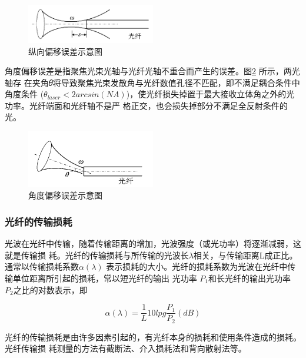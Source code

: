 \documentclass[10pt,a4paper,twoside,UTF8]{ctexart}
\begin{document}
\begin{figure}[H]
	\centering
	\includegraphics[width=0.5\textwidth]{img//5.png}
	\caption{纵向偏移误差示意图}
	\label{fig:5}
\end{figure}

角度偏移误差是指聚焦光束光轴与光纤光轴不重合而产生的误差。图\ref{fig:6} 所示，两光轴存
在夹角𝜃将导致聚焦光束发散角与光纤数值孔径不匹配，即不满足耦合条件中角度条件
($\theta_{laser}<2 arcsin(NA)$)，使光纤损失掉置于最大接收立体角之外的光功率。光纤端面和光纤轴不是严
格正交，也会损失掉部分不满足全反射条件的光。

\begin{figure}[H]
	\centering
	\includegraphics[width=0.5\textwidth]{img//6.png}
	\caption{ 角度偏移误差示意图}
	\label{fig:6}
\end{figure}

\subsubsection{光纤的传输损耗}
光波在光纤中传输，随着传输距离的增加，光波强度（或光功率）将逐渐减弱，这就是传输损
耗。光纤的传输损耗与所传输的光波长$\lambda$相关，与传输距离L成正比。通常以传输损耗系数$\alpha(\lambda)$
表示损耗的大小。光纤的损耗系数为光波在光纤中传输单位距离所引起的损耗，常以短光纤的输出
光功率 $P_1$和长光纤的输出光功率 $P_2$之比的对数表示，即

\begin{equation}
	\alpha\left(\lambda\right)=\frac{1}{L} 10 lpg \frac{P_1}{P_2} (dB)
	\label{eq:eff}
\end{equation}

光纤的传输损耗是由许多因素引起的，有光纤本身的损耗和使用条件造成的损耗。光纤传输损
耗测量的方法有截断法、介入损耗法和背向散射法等。
\end{document}
